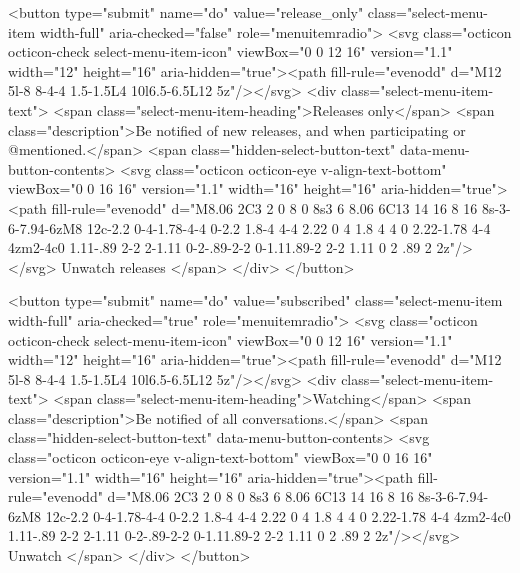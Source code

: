             <button type="submit" name="do" value="release_only" class="select-menu-item width-full" aria-checked="false" role="menuitemradio">
              <svg class="octicon octicon-check select-menu-item-icon" viewBox="0 0 12 16" version="1.1" width="12" height="16" aria-hidden="true"><path fill-rule="evenodd" d="M12 5l-8 8-4-4 1.5-1.5L4 10l6.5-6.5L12 5z"/></svg>
              <div class="select-menu-item-text">
                <span class="select-menu-item-heading">Releases only</span>
                <span class="description">Be notified of new releases, and when participating or @mentioned.</span>
                <span class="hidden-select-button-text" data-menu-button-contents>
                  <svg class="octicon octicon-eye v-align-text-bottom" viewBox="0 0 16 16" version="1.1" width="16" height="16" aria-hidden="true"><path fill-rule="evenodd" d="M8.06 2C3 2 0 8 0 8s3 6 8.06 6C13 14 16 8 16 8s-3-6-7.94-6zM8 12c-2.2 0-4-1.78-4-4 0-2.2 1.8-4 4-4 2.22 0 4 1.8 4 4 0 2.22-1.78 4-4 4zm2-4c0 1.11-.89 2-2 2-1.11 0-2-.89-2-2 0-1.11.89-2 2-2 1.11 0 2 .89 2 2z"/></svg>
                  Unwatch releases
                </span>
              </div>
            </button>

            <button type="submit" name="do" value="subscribed" class="select-menu-item width-full" aria-checked="true" role="menuitemradio">
              <svg class="octicon octicon-check select-menu-item-icon" viewBox="0 0 12 16" version="1.1" width="12" height="16" aria-hidden="true"><path fill-rule="evenodd" d="M12 5l-8 8-4-4 1.5-1.5L4 10l6.5-6.5L12 5z"/></svg>
              <div class="select-menu-item-text">
                <span class="select-menu-item-heading">Watching</span>
                <span class="description">Be notified of all conversations.</span>
                <span class="hidden-select-button-text" data-menu-button-contents>
                  <svg class="octicon octicon-eye v-align-text-bottom" viewBox="0 0 16 16" version="1.1" width="16" height="16" aria-hidden="true"><path fill-rule="evenodd" d="M8.06 2C3 2 0 8 0 8s3 6 8.06 6C13 14 16 8 16 8s-3-6-7.94-6zM8 12c-2.2 0-4-1.78-4-4 0-2.2 1.8-4 4-4 2.22 0 4 1.8 4 4 0 2.22-1.78 4-4 4zm2-4c0 1.11-.89 2-2 2-1.11 0-2-.89-2-2 0-1.11.89-2 2-2 1.11 0 2 .89 2 2z"/></svg>
                  Unwatch
                </span>
              </div>
            </button>

